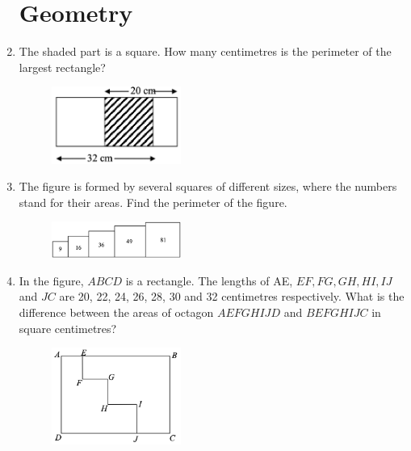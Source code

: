 \documentclass[11pt]{scrartcl}
\begin{document}
\begin{enumerate}
    \section{Geometry}
    \item The shaded part is a square. How many centimetres is the perimeter of the largest rectangle?
    \begin{figure}[h]
        \centering
        \includegraphics[width=0.4\textwidth]{StarGen/AIMO Trial G3-4 2024/shaded-square.png}
    \end{figure}
    
    
    \vspace{10cm} \item The figure is formed by several squares of different sizes, where the numbers stand for their areas. Find the perimeter of the figure.
    \begin{figure}[h]
        \centering
        \includegraphics[width=0.4\textwidth]{StarGen/AIMO Trial G3-4 2024/several-square.png}
    \end{figure}
    
    \vspace{10cm} \item In the figure, $ABCD$ is a rectangle. The lengths of AE, $EF, FG, GH, HI, IJ$ and $JC$ are 20, 22, 24, 26, 28, 30 and 32 centimetres respectively. What is the difference between the areas of octagon $AEFGHIJD$ and $BEFGHIJC$ in square centimetres?
    \begin{figure}[h]
        \centering
        \includegraphics[width=0.4\textwidth]{StarGen/AIMO Trial G3-4 2024/octagon.png}
    \end{figure}
\end{enumerate}
\end{document}
